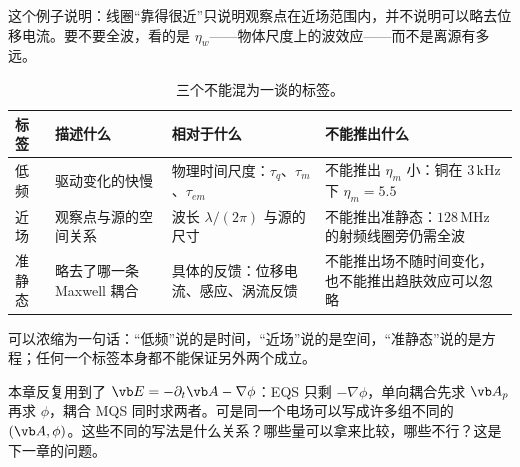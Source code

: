 这个例子说明：线圈“靠得很近”只说明观察点在近场范围内，并不说明可以略去位移电流。要不要全波，看的是 $\eta_w$——物体尺度上的波效应——而不是离源有多远。

\begin{table}[htbp]\centering\small
\caption{三个不能混为一谈的标签。}\label{tab:regimes-labels}
\begin{tabularx}{\linewidth}{@{}l Y Y Y@{}}
\toprule
标签 & 描述什么 & 相对于什么 & 不能推出什么\\\midrule
低频 & 驱动变化的快慢 & 物理时间尺度：$\tau_q$、$\tau_m$、$\tau_{em}$ & 不能推出 $\eta_m$ 小：铜在 $3\,\mathrm{kHz}$ 下 $\eta_m=5.5$\\
近场 & 观察点与源的空间关系 & 波长 $\lambda/(2\pi)$ 与源的尺寸 & 不能推出准静态：$128\,\mathrm{MHz}$ 的射频线圈旁仍需全波\\
准静态 & 略去了哪一条 Maxwell 耦合 & 具体的反馈：位移电流、感应、涡流反馈 & 不能推出场不随时间变化，也不能推出趋肤效应可以忽略\\
\bottomrule
\end{tabularx}
\end{table}

 可以浓缩为一句话：“低频”说的是时间，“近场”说的是空间，“准静态”说的是方程；任何一个标签本身都不能保证另外两个成立。

本章反复用到了 $\vb E=-\partial_t\vb A-\nabla\phi$：EQS 只剩 $-\nabla\phi$，单向耦合先求 $\vb A_p$ 再求 $\phi$，耦合 MQS 同时求两者。可是同一个电场可以写成许多组不同的 $(\vb A,\phi)$。这些不同的写法是什么关系？哪些量可以拿来比较，哪些不行？这是下一章的问题。

